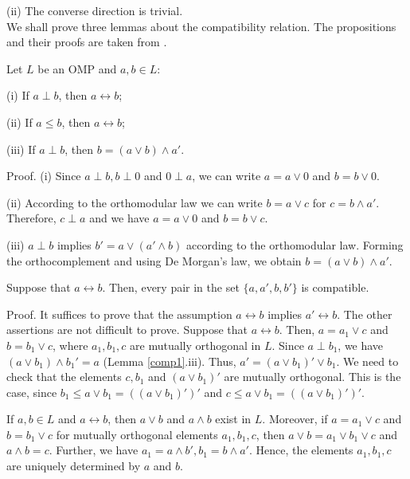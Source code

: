 (ii) The converse direction is trivial.\\

We shall prove three lemmas about the compatibility relation.
The propositions and their proofs are taken from \cite{ptak}.

\begin{lemma}
\label{comp1}
Let $L$ be an OMP and $a,b \in L$:

(i) If $a \perp b$, then $a \leftrightarrow b$;

(ii) If $a \le b$, then $a \leftrightarrow b$;

(iii) If $a \perp b$, then $b = (a \vee b) \wedge a'$.
\end{lemma}

Proof.
(i) Since $a \perp b, b \perp 0$ and $0 \perp a$, we can write
$a= a \vee 0$ and $b = b \vee 0$.

(ii) According to the orthomodular law we can write $b = a \vee c$
for $c = b \wedge a'$.
Therefore, $c \perp a$ and we have $a = a \vee 0$ and $b = b \vee c$.

(iii) $a \perp b$ implies $b' = a \vee (a' \wedge b)$ according to the
orthomodular law.
Forming the orthocomplement and using De Morgan's law, we obtain
$b = (a \vee b) \wedge a'$.

\begin{lemma}
\label{comp2}
Suppose that $a \leftrightarrow b$. Then, every pair in the
set $\{a,a',b,b'\}$ is compatible.
\end{lemma}

Proof.
It suffices to prove that the assumption $a \leftrightarrow b$
implies $a' \leftrightarrow b$.
The other assertions are not difficult to prove.
Suppose that $a \leftrightarrow b$.
Then, $a = a_1 \vee c$ and $b = b_1 \vee c$, where $a_1, b_1, c$
are mutually orthogonal in $L$.
Since $a \perp b_1$, we have $(a \vee b_1) \wedge b_1' = a$
(Lemma \ref{comp1}.iii).
Thus, $a' = (a \vee b_1)' \vee b_1$.
We need to check that the elements $c,b_1$ and $(a \vee b_1)'$
are mutually orthogonal. This is the case,
since $b_1 \le a \vee b_1 = ((a \vee b_1)')'$
and $c \le a \vee b_1 = ((a \vee b_1)')'$.

\begin{lemma}
\label{comp3}
If $a,b \in L$ and $a \leftrightarrow b$, then $a \vee b$ and $a \wedge b$
exist in $L$.
Moreover, if $a= a_1 \vee c$ and $b = b_1 \vee c$ for mutually
orthogonal elements $a_1,b_1,c$, then $a \vee b = a_1 \vee b_1 \vee c$
and $a \wedge b = c$.
Further, we have $a_1 = a \wedge b', b_1 = b \wedge a'$.
Hence, the elements $a_1,b_1,c$ are uniquely determined by $a$ and $b$.
\end{lemma}

